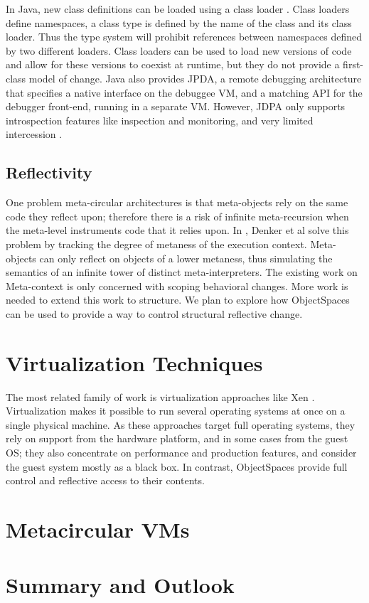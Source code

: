 In Java, new class definitions can be loaded using a class loader
\cite{Lian98a}. Class loaders define namespaces, a class type is defined by the
name of the class and its class loader. Thus the type system will prohibit
references between namespaces defined by two different loaders. Class loaders
can be used to load new versions of code and allow for these versions to coexist
at runtime, but they do not provide a first-class model of change.
Java also provides JPDA, a remote debugging architecture that specifies a native interface on the debuggee VM, and a matching API for the debugger front-end, running in a separate VM. However, JDPA only supports introspection features like  inspection and monitoring, and very limited intercession \cite{jdpa}.

\subsection*{Reflectivity}One problem meta-circular architectures is that meta-objects rely on the same code they reflect upon; therefore there is a risk of infinite meta-recursion when the meta-level instruments code that it relies upon.
In \cite{Denk08b}, Denker et al solve this problem by tracking the degree of metaness of the execution context. Meta-objects can only reflect on objects of a lower metaness, thus simulating the semantics of an infinite tower of distinct meta-interpreters. The existing work on Meta-context is only concerned with scoping behavioral changes. More work is needed to extend this work to structure. We plan to explore how ObjectSpaces can be used to provide a way to control structural reflective change.

\section{Virtualization Techniques}

The most related family of work is virtualization approaches like Xen \cite{Chis07xen}. Virtualization makes it possible to run several operating systems at once on a single physical machine. As these approaches target full operating systems, they rely on support from the hardware platform, and in some cases from the guest OS; they also concentrate on performance and production features, and consider the guest system mostly as a black box. In contrast, ObjectSpaces provide full control and reflective access to their contents.

\section{Metacircular VMs}

\section{Summary and Outlook}


